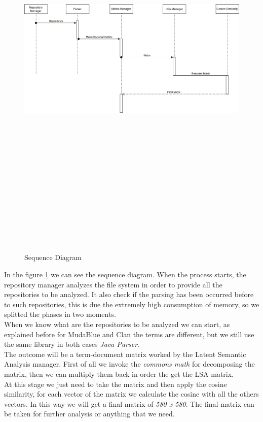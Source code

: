 \begin{figure}[H]
	\includegraphics[width=15cm,height=20cm,keepaspectratio]{images/SequenceDiagram.png}
	\caption{Sequence Diagram}
	\label{fig:Sequence}
\end{figure}

In the figure \ref{fig:Sequence} we can see the sequence diagram.
When the process starts, the repository manager analyzes the file system in order to provide all the repositories to be analyzed. It also check if the parsing has been occurred before to such repositories, this is due the extremely high consumption of memory, so we splitted the phases in two moments.\\
When we know what are the repositories to be analyzed we can start, as explained before for MudaBlue and Clan the terms are different, but we still use the same library in both cases \emph{Java Parser}.\\
The outcome will be a term-document matrix worked by the Latent Semantic Analysis manager.
First of all we invoke the \emph{commons math} for decomposing the matrix, then we can multiply them back in order the get the LSA matrix.\\
At this stage we just need to take the matrix and then apply the cosine similarity, for each vector of the matrix we calculate the cosine with all the others vectors. In this way we will get a final matrix of \emph{580 x 580}.
The final matrix can be taken for further analysis or anything that we need.

